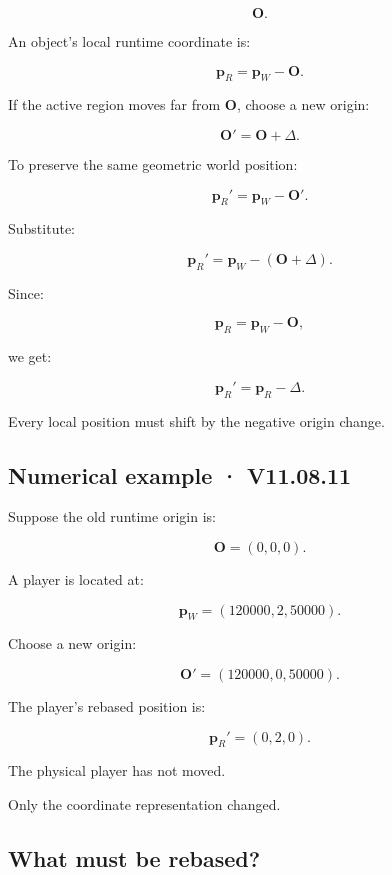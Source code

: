 \[
 \mathbf O.
\]

An object's local runtime coordinate is:

\[
 \boxed{ \mathbf p_R=\mathbf p_W-\mathbf O }.
\]

If the active region moves far from \(\mathbf O\), choose a new origin:

\[
 \mathbf O'=\mathbf O+\Delta.
\]

To preserve the same geometric world position:

\[
 \mathbf p_R'=\mathbf p_W-\mathbf O'.
\]

Substitute:

\[
 \mathbf p_R' = \mathbf p_W-(\mathbf O+\Delta).
\]

Since:

\[
 \mathbf p_R=\mathbf p_W-\mathbf O,
\]

we get:

\[
 \boxed{ \mathbf p_R'=\mathbf p_R-\Delta }.
\]

Every local position must shift by the negative origin change.

\subsection{Numerical example · V11.08.11}\label{02-foundations-ii-ch036-numerical-example-v11.08.11}

\hypertarget{02-foundations-ii-ch036-numerical-example-v11.08.11}{}

Suppose the old runtime origin is:

\[
 \mathbf O=(0,0,0).
\]

A player is located at:

\[
 \mathbf p_W=(120000,2,50000).
\]

Choose a new origin:

\[
 \mathbf O'=(120000,0,50000).
\]

The player's rebased position is:

\[
 \boxed{ \mathbf p_R'=(0,2,0) }.
\]

The physical player has not moved.

Only the coordinate representation changed.

\subsection{What must be rebased?}\label{02-foundations-ii-ch036-what-must-be-rebased}

\hypertarget{02-foundations-ii-ch036-what-must-be-rebased}{}

